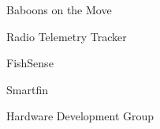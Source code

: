 \item Baboons on the Move
\item Radio Telemetry Tracker
\item FishSense
\item Smartfin
\item Hardware Development Group
